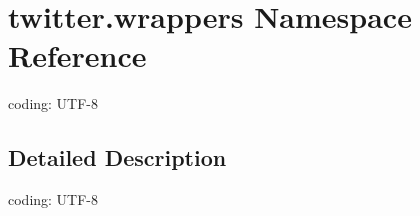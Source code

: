 \hypertarget{namespacetwitter_1_1wrappers}{}\section{twitter.\+wrappers Namespace Reference}
\label{namespacetwitter_1_1wrappers}


coding\+: U\+T\+F-\/8  




\subsection{Detailed Description}
coding\+: U\+T\+F-\/8 
